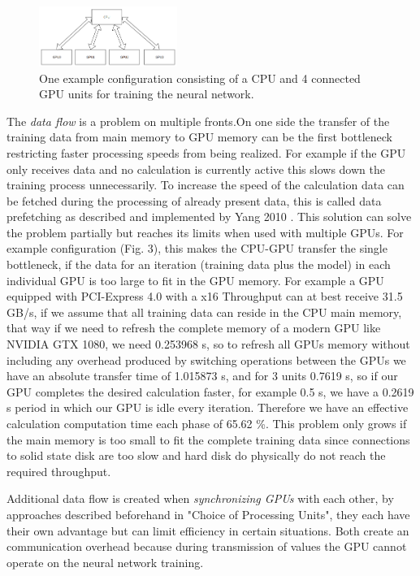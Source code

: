 \documentclass[conference]{IEEEtran}
\begin{document}
\begin{figure}
\centering
\includegraphics[width=0.4\textwidth]{example_configuration.png}
\caption{One example configuration consisting of a CPU and 4 connected GPU units for training the neural network.}
\end{figure}

The \emph{data flow} is a problem on multiple fronts.On one side the transfer of the training data from main memory to GPU memory can be the first bottleneck restricting faster processing speeds from being realized. For example if the GPU only receives data and no calculation is currently active this slows down the training process unnecessarily. To increase the speed of the calculation data can be fetched during the processing of already present data, this is called data prefetching as described and implemented by Yang 2010 \cite{yang2010gpgpu}. This solution can solve the problem partially but reaches its limits when used with multiple GPUs. For example configuration (Fig. 3), this makes the CPU-GPU transfer the single bottleneck, if the data for an iteration (training data plus the model) in each individual GPU is too large to fit in the GPU memory. For example a GPU equipped with PCI-Express 4.0 with a x16 Throughput can at best receive 31.5 GB/s, if we assume that all training data can reside in the CPU main memory, that way if we need to refresh the complete memory of a modern GPU like NVIDIA GTX 1080, we need 0.253968 s, so to refresh all GPUs memory without including any overhead produced by switching operations between the GPUs we have an absolute transfer time of 1.015873 s, and for 3 units 0.7619 s, so if our GPU completes the desired calculation faster, for example 0.5 s, we have a 0.2619 s period in which our GPU is idle every iteration. Therefore we have an effective calculation computation time each phase of 65.62 \%. This problem only grows if the main memory is too small to fit the complete training data since connections to solid state disk are too slow and hard disk do physically do not reach the required throughput.

Additional data flow is created when \emph{synchronizing GPUs} with each other, by approaches described beforehand in "Choice of Processing Units", they each have their own advantage but can limit efficiency in certain situations. Both create an communication overhead because during transmission of values the GPU cannot operate on the neural network training.
\end{document}

